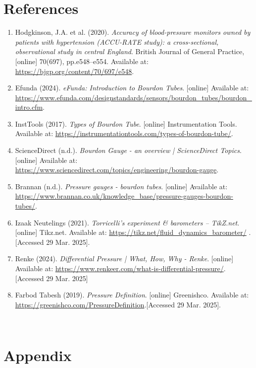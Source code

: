 \documentclass{article}
\begin{document}
	
	\newpage
	\section{References}	
	\begin{enumerate}
		\item Hodgkinson, J.A. et al. (2020). \textit{Accuracy of blood-pressure monitors owned by patients with hypertension (ACCU-RATE study): a cross-sectional, observational study in central England}. British Journal of General Practice, [online] 70(697), pp.e548–e554. Available at: \url{https://bjgp.org/content/70/697/e548}.
		\item Efunda (2024). \textit{eFunda: Introduction to Bourdon Tubes}. [online] Available at: \url{https://www.efunda.com/designstandards/sensors/bourdon_tubes/bourdon_intro.cfm}.
		\item InstTools (2017). \textit{Types of Bourdon Tube}. [online] Instrumentation Tools. Available at: \url{https://instrumentationtools.com/types-of-bourdon-tube/}.
		\item ScienceDirect (n.d.). \textit{Bourdon Gauge - an overview | ScienceDirect Topics}. [online] Available at: \url{https://www.sciencedirect.com/topics/engineering/bourdon-gauge}.
		‌\item Brannan (n.d.). \textit{Pressure gauges - bourdon tubes}. [online] Available at: \url{https://www.brannan.co.uk/knowledge_base/pressure-gauges-bourdon-tubes/}.
		\item Izaak Neutelings (2021). \textit{Torricelli’s experiment \& barometers – TikZ.net}. [online] Tikz.net. Available at: \url{https://tikz.net/fluid_dynamics_barometer/} .[Accessed 29 Mar. 2025].
		\item Renke (2024). \textit{Differential Pressure | What, How, Why - Renke}. [online] Available at: \url{https://www.renkeer.com/what-is-differential-pressure/}.[Accessed 29 Mar. 2025]
		\item Farbod Tabesh (2019). \textit{Pressure Definition}. [online] Greenishco. Available at: \url{https://greenishco.com/PressureDefinition}.[Accessed 29 Mar. 2025].	‌
	\end{enumerate}
	‌	
	\newpage
	
\section{Appendix}
\renewcommand{\thesubsection}{\Alph{subsection}}
\end{document}
